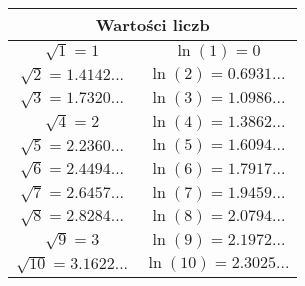 \documentclass[a4paper,11pt]{article}
\begin{document}
\begin{center}

  \begin{tabular}{|c|c|}
    \hline
    \multicolumn{2}{|c|}{Wartości liczb} \\
    \hline
    $\sqrt{ 1 } = 1$ & $\ln( 1 ) = 0$ \\
    $\sqrt{ 2 } = 1.4142...$ & $\ln( 2 ) = 0.6931...$ \\
    $\sqrt{ 3 } = 1.7320...$ & $\ln( 3 ) = 1.0986...$ \\
    $\sqrt{ 4 } = 2$ & $\ln( 4 ) = 1.3862...$ \\
    $\sqrt{ 5 } = 2.2360...$ & $\ln( 5 ) = 1.6094...$ \\
    $\sqrt{ 6 } = 2.4494...$ & $\ln( 6 ) = 1.7917...$ \\
    $\sqrt{ 7 } = 2.6457...$ & $\ln( 7 ) = 1.9459...$ \\
    $\sqrt{ 8 } = 2.8284...$ & $\ln( 8 ) = 2.0794...$ \\
    $\sqrt{ 9 } = 3$ & $\ln( 9 ) = 2.1972...$ \\
    $\sqrt{ 10 } = 3.1622...$ & $\ln( 10 ) = 2.3025...$ \\
    \hline
  \end{tabular}


\end{center}
\end{document}
